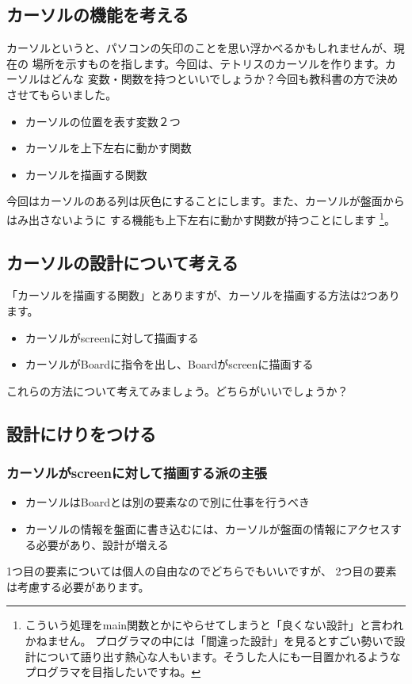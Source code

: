 \documentclass[12pt, a4paper, dvipdfmx]{book}
\begin{document}
\subsection{カーソルの機能を考える}
カーソルというと、パソコンの矢印のことを思い浮かべるかもしれませんが、現在の
場所を示すものを指します。今回は、テトリスのカーソルを作ります。カーソルはどんな
変数・関数を持つといいでしょうか？今回も教科書の方で決めさせてもらいました。
\begin{itemize}
  \item カーソルの位置を表す変数２つ
  \item カーソルを上下左右に動かす関数
  \item カーソルを描画する関数
\end{itemize}
今回はカーソルのある列は灰色にすることにします。また、カーソルが盤面からはみ出さないように
する機能も上下左右に動かす関数が持つことにします
\footnote{こういう処理をmain関数とかにやらせてしまうと「良くない設計」と言われかねません。
  プログラマの中には「間違った設計」を見るとすごい勢いで設計について語り出す熱心な人もいます。そうした人にも一目置かれるようなプログラマを目指したいですね。}。
\subsection{カーソルの設計について考える}
「カーソルを描画する関数」とありますが、カーソルを描画する方法は2つあります。
\begin{itemize}
  \item カーソルがscreenに対して描画する
  \item カーソルがBoardに指令を出し、Boardがscreenに描画する
\end{itemize}
これらの方法について考えてみましょう。どちらがいいでしょうか？
\newpage
\subsection{設計にけりをつける}
\subsubsection{カーソルがscreenに対して描画する派の主張}
\begin{itemize}
  \item カーソルはBoardとは別の要素なので別に仕事を行うべき
  \item カーソルの情報を盤面に書き込むには、カーソルが盤面の情報にアクセスする必要があり、設計が増える
\end{itemize}
1つ目の要素については個人の自由なのでどちらでもいいですが、
2つ目の要素は考慮する必要があります。
\end{document}
